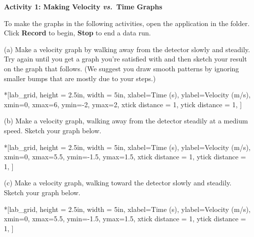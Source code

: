 \bigskip

\textbf{Activity 1: Making Velocity \textit{vs.}~Time Graphs} 

To make the graphs in the following activities, open the  application in the \filename{\coursefolder} folder. Click \textbf{Record} to begin, \textbf{Stop} to end a data run.

(a) Make a velocity graph by walking away from the detector slowly and steadily.
Try again until you get a graph you're satisfied with and then sketch your result
on the graph that follows. (We suggest you draw smooth patterns by ignoring
smaller bumps that are mostly due to your steps.)

\begin{lab_axis}*[lab_grid,
	height = {2.5in}, width = {5in},
	xlabel={Time (s)},
	ylabel={Velocity (m/s)},
	xmin=0, xmax=6,
	ymin=-2, ymax=2,
	xtick distance = 1,
	ytick distance = 1,
	]
\end{lab_axis}

(b) Make a velocity graph, walking away from the detector steadily at a medium
speed. Sketch your graph below.

\begin{lab_axis}*[lab_grid,
	height = {2.5in}, width = {5in},
	xlabel={Time (s)},
	ylabel={Velocity (m/s)},
	xmin=0, xmax=5.5,
	ymin=-1.5, ymax=1.5,
	xtick distance = 1,
	ytick distance = 1,
	]
\end{lab_axis}

(c) Make a velocity graph, walking toward the detector slowly and steadily.
Sketch your graph below.

\begin{lab_axis}*[lab_grid,
	height = {2.5in}, width = {5in},
	xlabel={Time (s)},
	ylabel={Velocity (m/s)},
	xmin=0, xmax=5.5,
	ymin=-1.5, ymax=1.5,
	xtick distance = 1,
	ytick distance = 1,
	]
\end{lab_axis}

